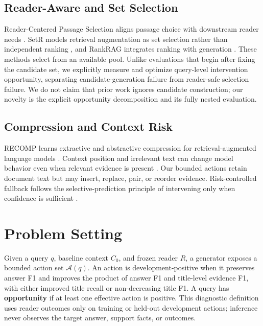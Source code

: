 \documentclass[10pt,twocolumn]{article}
\begin{document}
\subsection{Reader-Aware and Set Selection}

Reader-Centered Passage Selection aligns passage choice with downstream reader needs \citep{xin-etal-2025-rcps}. SetR models retrieval augmentation as set selection rather than independent ranking \citep{lee-etal-2025-setr}, and RankRAG integrates ranking with generation \citep{yu-etal-2024-rankrag}. These methods select from an available pool. Unlike evaluations that begin after fixing the candidate set, we explicitly measure and optimize query-level intervention opportunity, separating candidate-generation failure from reader-safe selection failure. We do not claim that prior work ignores candidate construction; our novelty is the explicit opportunity decomposition and its fully nested evaluation.

\subsection{Compression and Context Risk}

RECOMP learns extractive and abstractive compression for retrieval-augmented language models \citep{xu-etal-2024-recomp}. Context position and irrelevant text can change model behavior even when relevant evidence is present \citep{liu-etal-2024-lost,shi-etal-2023-distracted}. Our bounded actions retain document text but may insert, replace, pair, or reorder evidence. Risk-controlled fallback follows the selective-prediction principle of intervening only when confidence is sufficient \citep{geifman-elyaniv-2019-selectivenet}.

\section{Problem Setting}

Given a query $q$, baseline context $C_0$, and frozen reader $R$, a generator exposes a bounded action set $\mathcal{A}(q)$. An action is development-positive when it preserves answer F1 and improves the product of answer F1 and title-level evidence F1, with either improved title recall or non-decreasing title F1. A query has \textbf{opportunity} if at least one effective action is positive. This diagnostic definition uses reader outcomes only on training or held-out development actions; inference never observes the target answer, support facts, or outcomes.
\end{document}
